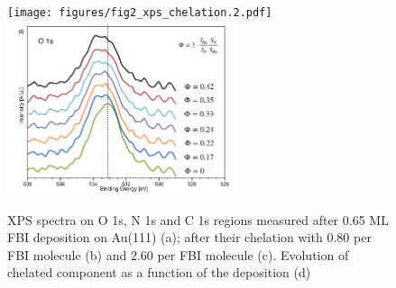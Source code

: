 \documentclass[aps,prl,reprint,longbibliography,superscriptaddress, english]{revtex4-1}
\begin{document}
\begin{figure}[ht!]
	\texttt{[image: figures/fig2\_xps\_chelation.2.pdf]}
	\includegraphics[width=0.6\textwidth]{figures/fig2_xps_chelation.2d).pdf}
	
	\caption{\label{XPS_FBI_Au(111)} 
    XPS spectra on O 1s, N 1s and C 1s regions measured after 0.65 ML FBI deposition on Au(111) (a); after their chelation with 0.80 \Bapp per FBI molecule (b) and 2.60 \Nap per FBI molecule (c). Evolution of chelated component as a function of the \Bapp deposition (d)}
\end{figure}  
\end{document}
